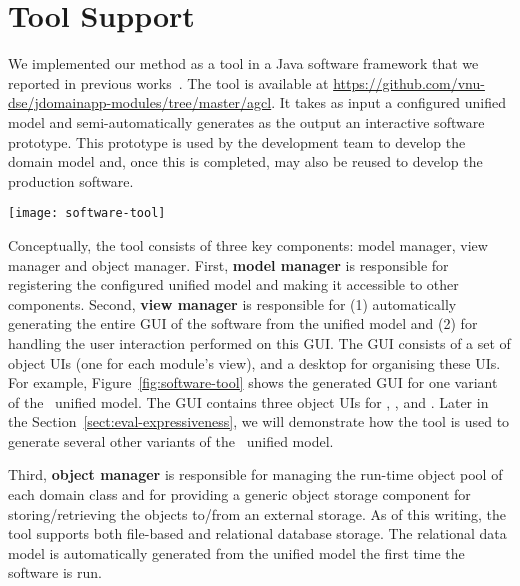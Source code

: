 \section{Tool Support}
\label{sect:tool} %

We implemented our method as a tool in a Java software framework that we reported in previous works~\cite{le_domain_2018,le_generative_2017, le_jdomainapp_2017}. The tool is available at \url{https://github.com/vnu-dse/jdomainapp-modules/tree/master/agcl}. It takes as input a configured unified model and semi-automatically generates as the output an interactive software prototype. This prototype is used by the development team to develop the domain model and, once this is completed, may also be reused to develop the production software.

\begin{figure*}[ht]
	\centering
	\texttt{[image: software-tool]}
	\caption{The GUI of \courseman~software generated by the tool: (1) desktop, 
		(2-4) the object UIs of , , and .} %
	\label{fig:software-tool}
\end{figure*}

Conceptually, the tool consists of three key components: model manager, view manager and object manager. First, \textbf{model manager} is responsible for registering the configured unified model and making it accessible to other components. 
Second, \textbf{view manager} is responsible for (1) automatically generating the entire GUI of the software from the unified model and (2) for handling the user interaction performed on this GUI. The GUI consists of a set of object UIs (one for each module's view), and a desktop for organising these UIs. For example, Figure~\ref{fig:software-tool} shows the generated GUI for one variant of the \courseman~unified model. The GUI contains three object UIs for , , and .
Later in the Section~\ref{sect:eval-expressiveness}, we will demonstrate how the tool is used to generate several other variants of the \courseman~unified model. 

Third, \textbf{object manager} is responsible for managing the run-time object pool of each domain class and for providing a generic object storage component for storing/retrieving the objects to/from an external storage. As of this writing, the tool supports both file-based and relational database storage. The relational data model is automatically generated from the unified model the first time the software is run.